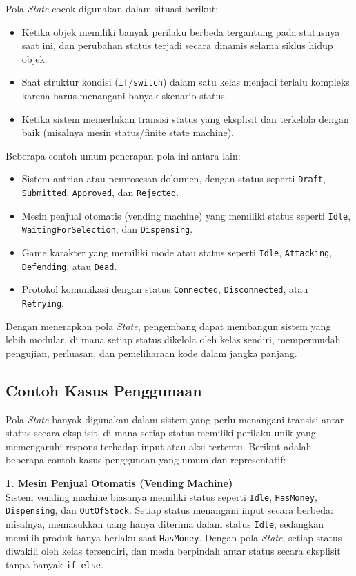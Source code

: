 Pola \textit{State} cocok digunakan dalam situasi berikut:
\begin{itemize}
	\item Ketika objek memiliki banyak perilaku berbeda tergantung pada statusnya saat ini, dan perubahan status terjadi secara dinamis selama siklus hidup objek.
	\item Saat struktur kondisi (\texttt{if}/\texttt{switch}) dalam satu kelas menjadi terlalu kompleks karena harus menangani banyak skenario status.
	\item Ketika sistem memerlukan transisi status yang eksplisit dan terkelola dengan baik (misalnya mesin status/finite state machine).
\end{itemize}

Beberapa contoh umum penerapan pola ini antara lain:
\begin{itemize}
	\item Sistem antrian atau pemrosesan dokumen, dengan status seperti \texttt{Draft}, \texttt{Submitted}, \texttt{Approved}, dan \texttt{Rejected}.
	\item Mesin penjual otomatis (vending machine) yang memiliki status seperti \texttt{Idle}, \texttt{WaitingForSelection}, dan \texttt{Dispensing}.
	\item Game karakter yang memiliki mode atau status seperti \texttt{Idle}, \texttt{Attacking}, \texttt{Defending}, atau \texttt{Dead}.
	\item Protokol komunikasi dengan status \texttt{Connected}, \texttt{Disconnected}, atau \texttt{Retrying}.
\end{itemize}

Dengan menerapkan pola \textit{State}, pengembang dapat membangun sistem yang lebih modular, di mana setiap status dikelola oleh kelas sendiri, mempermudah pengujian, perluasan, dan pemeliharaan kode dalam jangka panjang.

\subsection{Contoh Kasus Penggunaan}

Pola \textit{State} banyak digunakan dalam sistem yang perlu menangani transisi antar status secara eksplisit, di mana setiap status memiliki perilaku unik yang memengaruhi respons terhadap input atau aksi tertentu. Berikut adalah beberapa contoh kasus penggunaan yang umum dan representatif:

\textbf{1. Mesin Penjual Otomatis (Vending Machine)} \\
Sistem vending machine biasanya memiliki status seperti \texttt{Idle}, \texttt{HasMoney}, \texttt{Dispensing}, dan \texttt{OutOfStock}. Setiap status menangani input secara berbeda: misalnya, memasukkan uang hanya diterima dalam status \texttt{Idle}, sedangkan memilih produk hanya berlaku saat \texttt{HasMoney}. Dengan pola \textit{State}, setiap status diwakili oleh kelas tersendiri, dan mesin berpindah antar status secara eksplisit tanpa banyak \texttt{if-else}.

